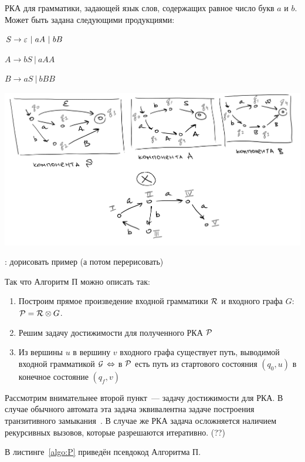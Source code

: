     \begin{example}
        РКА для грамматики, задающей язык слов, содержащих равное число букв $a$ и $b$. Может быть задана следующими продукциями:

        $S \rightarrow \varepsilon~|~aA~|~bB$

        $A \to bS~|~aAA$
        
        $B \to aS~|~bBB$

        \includegraphics[width=1\linewidth]{img/example_intersection1.png}

        \TODO: дорисовать пример (а потом перерисовать)


    \end{example}

    Так что Алгоритм П можно описать так:
    \begin{enumerate}
        \item Построим прямое произведение входной грамматики $\mathcal{R}$ и входного графа $G$: $\mathcal{P} = \mathcal{R} \otimes G$.
        \item Решим задачу достижимости для полученного РКА $\mathcal{P}$
        \item Из вершины $u$ в вершину $v$ входного графа существует путь, выводимой входной грамматикой $\mathcal{G}$ $\Leftrightarrow$ в $\mathcal{P}$ есть путь из стартового состояния $(q_0, u)$ в конечное состояние $(q_f, v)$
    \end{enumerate}

    Рассмотрим внимательнее второй пункт~--- задачу достижимости для РКА. В случае обычного автомата эта задача эквивалентна задаче построения транзитивного замыкания~\cite{Yannakakis1990}. В случае же РКА задача осложняется наличием рекурсивных вызовов, которые разрешаются итеративно. (??)

    В листинге~\ref{algo:P} приведён псевдокод Алгоритма П.

